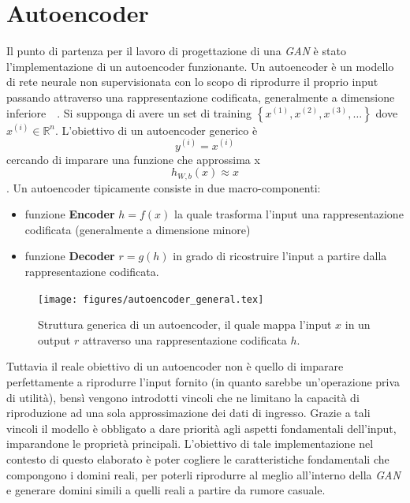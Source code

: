 \newpage
\section{Autoencoder}
\label{autoencoder}
Il punto di partenza per il lavoro di progettazione di una \textit{GAN} è stato l'implementazione di un autoencoder funzionante.  Un autoencoder è un modello di rete neurale non supervisionata con lo scopo di riprodurre il proprio input passando attraverso una rappresentazione codificata, generalmente a dimensione inferiore~\cite{MAL-006}~\cite{Liou:2008:MWP:1411851.1412074}. Si supponga di avere un set di training $\left\{ x^{(1)}, x^{(2)}, x^{(3)}, \ldots \right\}$ dove $x^{(i)} \in \mathbb{R}^n$. L'obiettivo di un autoencoder generico è \[y^{(i)} = x^{(i)}\] cercando di imparare una funzione che approssima x \[h_{W,b}(x) \approx x\]. Un autoencoder tipicamente consiste in due macro-componenti:
\begin{itemize}
\item funzione \textbf{Encoder} $h = f(x)$ la quale trasforma l'input una rappresentazione codificata (generalmente a dimensione minore)
\item funzione \textbf{Decoder} $r = g(h)$ in grado di ricostruire l'input a partire dalla rappresentazione codificata. 
\end{itemize}

\begin{figure}[htb]
    \centering
	\texttt{[image: figures/autoencoder\_general.tex]}
	\caption{Struttura generica di un autoencoder, il quale mappa l'input $x$ in un output $r$ attraverso una rappresentazione codificata $h$.
\label{fig:autoencodergen}}
\end{figure}

Tuttavia il reale obiettivo di un autoencoder non è quello di imparare perfettamente a riprodurre l'input fornito (in quanto sarebbe un'operazione priva di utilità), bensì vengono introdotti vincoli che ne limitano la capacità di riproduzione ad una sola approssimazione dei dati di ingresso. Grazie a tali vincoli il modello è obbligato a dare priorità agli aspetti fondamentali dell'input, imparandone le proprietà principali. L'obiettivo di tale implementazione nel contesto di questo elaborato è poter cogliere le caratteristiche fondamentali che compongono i domini reali, per poterli riprodurre al meglio all'interno della \textit{GAN} e generare domini simili a quelli reali a partire da rumore casuale.

